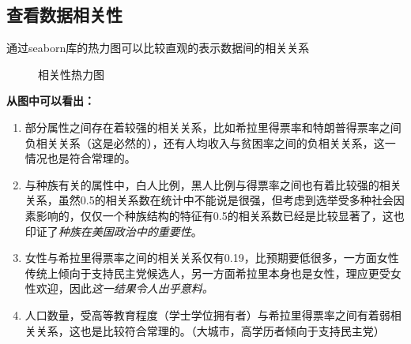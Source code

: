 \documentclass[
12pt, %
UTF8
]{fphw}
\begin{document}
	\subsection{查看数据相关性}
	通过seaborn库的热力图可以比较直观的表示数据间的相关关系\\
	\begin{figure}[H]
	\caption{相关性热力图}
	\end{figure}
	\textbf{从图中可以看出：}
	\begin{enumerate}
		\item 部分属性之间存在着较强的相关关系，比如希拉里得票率和特朗普得票率之间负相关关系（这是必然的），还有人均收入与贫困率之间的负相关关系，这一情况也是符合常理的。
		\item 与种族有关的属性中，白人比例，黑人比例与得票率之间也有着比较强的相关关系，虽然0.5的相关系数在统计中不能说是很强，但考虑到选举受多种社会因素影响的，仅仅一个种族结构的特征有0.5的相关系数已经是比较显著了，这也印证了\emph{种族在美国政治中的重要性}。
		\item 女性与希拉里得票率之间的相关关系仅有0.19，比预期要低很多，一方面女性传统上倾向于支持民主党候选人，另一方面希拉里本身也是女性，理应更受女性欢迎，因此\emph{这一结果令人出乎意料。}
		\item 人口数量，受高等教育程度（学士学位拥有者）与希拉里得票率之间有着弱相关关系，这也是比较符合常理的。（大城市，高学历者倾向于支持民主党）
	\end{enumerate}
\end{document}

